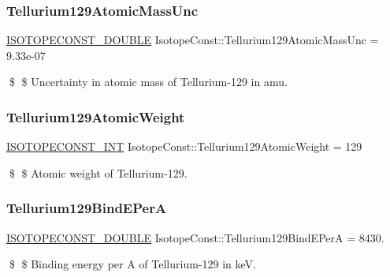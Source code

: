 \subsubsection{\texorpdfstring{Tellurium129\+Atomic\+Mass\+Unc}{Tellurium129AtomicMassUnc}}
{\footnotesize\ttfamily \mbox{\hyperlink{group___isotope_const-_macros_ga8f45a7272ce02c0b4c65c44636ed719a}{I\+S\+O\+T\+O\+P\+E\+C\+O\+N\+S\+T\+\_\+\+D\+O\+U\+B\+LE}} Isotope\+Const\+::\+Tellurium129\+Atomic\+Mass\+Unc = 9.\+33e-\/07}

\$ \$ Uncertainty in atomic mass of Tellurium-\/129 in amu. \mbox{\label{group___isotope_const-_tellurium-_te129_gacbe9e9e88a4fed6d9626c79320a2d1c3}} 
\subsubsection{\texorpdfstring{Tellurium129\+Atomic\+Weight}{Tellurium129AtomicWeight}}
{\footnotesize\ttfamily \mbox{\hyperlink{group___isotope_const-_macros_ga5f18360b3e99483a35c32d789e62621c}{I\+S\+O\+T\+O\+P\+E\+C\+O\+N\+S\+T\+\_\+\+I\+NT}} Isotope\+Const\+::\+Tellurium129\+Atomic\+Weight = 129}

\$ \$ Atomic weight of Tellurium-\/129. \mbox{\label{group___isotope_const-_tellurium-_te129_ga114955878d4dbb2b35b2d4be284692fc}} 
\subsubsection{\texorpdfstring{Tellurium129\+Bind\+E\+PerA}{Tellurium129BindEPerA}}
{\footnotesize\ttfamily \mbox{\hyperlink{group___isotope_const-_macros_ga8f45a7272ce02c0b4c65c44636ed719a}{I\+S\+O\+T\+O\+P\+E\+C\+O\+N\+S\+T\+\_\+\+D\+O\+U\+B\+LE}} Isotope\+Const\+::\+Tellurium129\+Bind\+E\+PerA = 8430.}

\$ \$ Binding energy per A of Tellurium-\/129 in keV. \mbox{\label{group___isotope_const-_tellurium-_te129_gaab2f80939444509f33eb6001043f85b9}} 
